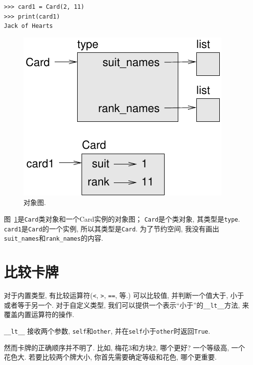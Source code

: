 \documentclass[10pt]{book}
\begin{document}
\begin{verbatim}
>>> card1 = Card(2, 11)
>>> print(card1)
Jack of Hearts
\end{verbatim}

\begin{figure}
\centerline
{\includegraphics[scale=0.8]{figs/card1.pdf}}
\caption{对象图.}
\label{fig.card1}
\end{figure}

图~\ref{fig.card1}是{\tt Card}类对象和一个Card实例的对象图；
{\tt Card}是个类对象, 其类型是{\tt type}.  
{\tt card1}是{\tt Card}的一个实例, 
所以其类型是{\tt Card}.
为了节约空间, 我没有画出\verb"suit_names"和\verb"rank_names"的内容. 
  


\section{比较卡牌}
\label{comparecard}

对于内置类型, 有比较运算符({\tt <}, {\tt >}, {\tt ==}, 等.)
可以比较值, 并判断一个值大于, 小于或者等于另一个. 
对于自定义类型, 我们可以提供一个表示``小于''的\verb"__lt__"方法, 
来覆盖内置运算符的操作. 

\verb"__lt__" 接收两个参数, {\tt self}和{\tt other},
并在{\tt self}小于{\tt other}时返回{\tt True}.

然而卡牌的正确顺序并不明了. 
比如, 梅花3和方块2, 哪个更好?
一个等级高, 一个花色大. 
若要比较两个牌大小, 你首先需要确定等级和花色, 哪个更重要. 
\end{document}
